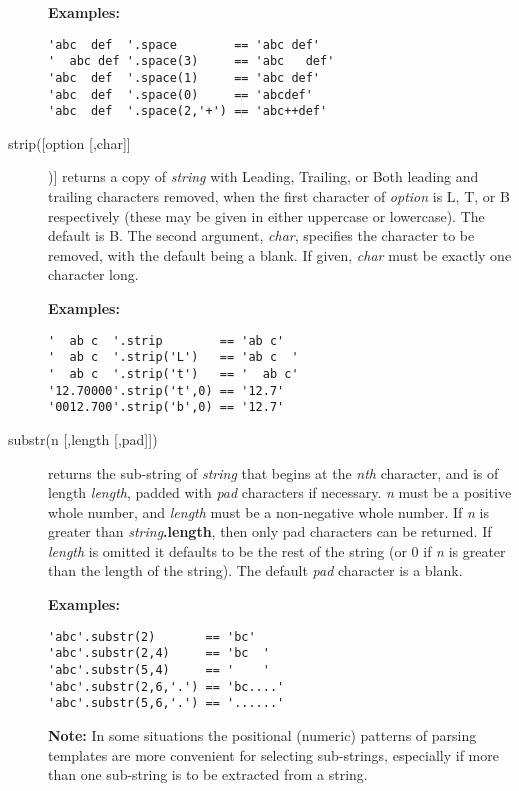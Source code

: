 \begin{description}
\textbf{Examples:}
\begin{lstlisting}
'abc  def  '.space        == 'abc def'
'  abc def '.space(3)     == 'abc   def'
'abc  def  '.space(1)     == 'abc def'
'abc  def  '.space(0)     == 'abcdef'
'abc  def  '.space(2,'+') == 'abc++def'
\end{lstlisting}

\item[strip([option [,char{]]}])]\label{refstrip}
returns a copy of \emph{string} with Leading, Trailing, or Both
leading and trailing characters removed, when the first character of
\emph{option} is L, T, or B respectively (these may be given in
either uppercase or lowercase).  The default is B.
The second argument, \emph{char}, specifies the character to be
removed, with the default being a blank.
If given, \emph{char} must be exactly one character long.
 
\textbf{Examples:}
\begin{lstlisting}
'  ab c  '.strip        == 'ab c'
'  ab c  '.strip('L')   == 'ab c  '
'  ab c  '.strip('t')   == '  ab c'
'12.70000'.strip('t',0) == '12.7'
'0012.700'.strip('b',0) == '12.7'
\end{lstlisting}

\item[substr(n [,length [,pad{]]})]\label{refsubstr}
returns the sub-string of \emph{string} that begins at the
\emph{n}\emph{th} character, and is of length \emph{length}, padded
with \emph{pad} characters if necessary.
\emph{n} must be a positive whole number, and \emph{length} must
be a non-negative whole number.
If \emph{n} is greater than \emph{string}\textbf{.length},
then only pad characters can be returned.
 If \emph{length} is omitted it defaults to be the rest of the
string (or 0 if \emph{n} is greater than the length of the string).
The default \emph{pad} character is a blank.
 
\textbf{Examples:}
\begin{lstlisting}
'abc'.substr(2)       == 'bc'
'abc'.substr(2,4)     == 'bc  '
'abc'.substr(5,4)     == '    '
'abc'.substr(2,6,'.') == 'bc....'
'abc'.substr(5,6,'.') == '......'
\end{lstlisting}
\textbf{Note: }In some situations the positional (numeric) patterns of parsing
templates are more convenient for selecting sub-strings, especially if
more than one sub-string is to be extracted from a string.


\end{description}
